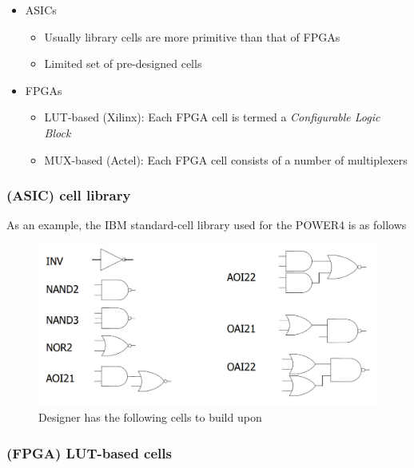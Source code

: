\documentclass{article}
\begin{document}
\begin{itemize}
    \item ASICs
        \begin{itemize}
            \item Usually library cells are more primitive than that of FPGAs
            \item Limited set of pre-designed cells
        \end{itemize}
    \item FPGAs
        \begin{itemize}
            \item LUT-based (Xilinx): Each FPGA cell is termed a \textit{Configurable Logic Block}
            \item MUX-based (Actel): Each FPGA cell consists of a number of multiplexers
        \end{itemize}
\end{itemize}

\subsubsection{(ASIC) cell library}
As an example, the IBM standard-cell library used for the POWER4 is as follows

\begin{figure}[htp]
    \centering
    \includegraphics[width=12cm, scale=1]{S2/asicCellLibrary.PNG}
    \caption{Designer has the following cells to build upon}
\end{figure}

\newpage
\subsubsection{(FPGA) LUT-based cells}
\end{document}
